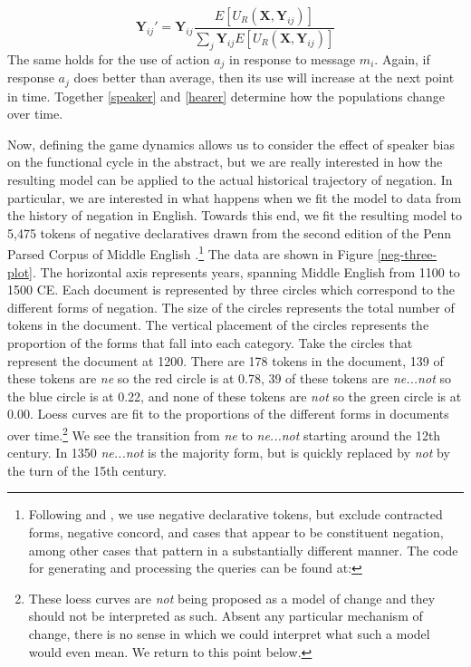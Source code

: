 \documentclass[linguex]{sp}
\theoremstyle{definition} \newtheorem{definition}{Definition}
\begin{document}
\begin{equation}
     \mathbf{Y}_{ij}' = \mathbf{Y}_{ij}\frac{E[U_R(\mathbf{X}, \mathbf{Y}_{ij})]}{\sum_j \mathbf{Y}_{ij} E[U_R(\mathbf{X}, \mathbf{Y}_{ij})]}
          \label{hearer}
\end{equation}
The same holds for the use of action $a_j$ in response to message $m_i$. Again, if response $a_j$ does better than average, then its use will increase at the next point in time. Together  
\eqref{speaker} and \eqref{hearer} determine how the populations change over time.

Now, defining the game dynamics allows us to consider the effect of speaker bias on the functional cycle in the abstract, but we are really interested in how the resulting model can be applied to the actual historical trajectory of negation. In particular, we are interested in what happens when we fit the model to data from the history of negation in English. Towards this end, we fit the resulting model to 5,475 tokens of negative declaratives drawn from the second edition of the Penn Parsed Corpus of Middle English \citep{ppcme2}.\footnote{Following \cite{wallage2008} and \cite{ecay-tamminga2015}, we use negative declarative tokens, but exclude contracted forms, negative concord, and cases that appear to be constituent negation, among other cases that pattern in a substantially different manner. The code for generating and processing the queries can be found at: } The data are shown in Figure \ref{neg-three-plot}. The horizontal axis represents years, spanning Middle English from 1100 to 1500 CE. Each document is represented by three circles which correspond to the different forms of negation. The size of the circles represents the total number of tokens in the document. The vertical placement of the circles represents the proportion of the forms that fall into each category. Take the circles that represent the document at 1200.  There are 178 tokens in the document, 139 of these tokens are \textit{\color{red} ne} so the red circle is at 0.78, 39 of these tokens are \textit{\color{blue} ne...not} so the blue circle is at 0.22, and none of these tokens are \textit{\color{green} not} so the green circle is at 0.00.  Loess curves are fit to the proportions of the different forms in documents over time.\footnote{These loess curves are \emph{not} being proposed as a model of change and they should not be interpreted as such. Absent any particular mechanism of change, there is no sense in which we could interpret what such a model would even mean. We return to this point below.} We see the transition from \textit{\color{red} ne} to \textit{\color{blue} ne...not} starting around the 12th century. In 1350 \textit{\color{blue} ne...not} is the majority form, but is quickly replaced by \textit{\color{green} not} by the turn of the 15th century.
\end{document}
